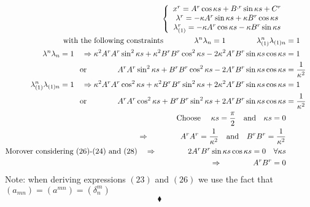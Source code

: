 \begin{align}
\left \{ \begin{array}{c}
x^r = A^{r}\cos \kappa s   + B^{,r}\sin \kappa s + C^r\\
\lambda^r =  -\kappa A^{r}\sin \kappa s  +\kappa B^{r}\cos \kappa s\\
\lambda_{(1)}^r = - \kappa A^{r}\cos \kappa s  - \kappa B^{r}\sin \kappa s\\
\end{array} \right.\\
\text{with the following constraints}\quad\quad\quad\quad \lambda^n\lambda_n = 1\quad\quad\quad\quad 
\lambda_{(1)}^n\lambda_{(1)n} &= 1\\
\lambda^n\lambda_n = 1\quad\Rightarrow \kappa^2 A^r A^r \sin ^2 \kappa s+ \kappa^2 B^r B^r \cos ^2 \kappa s - 2 \kappa^2 A^rB^r\sin\kappa s\cos \kappa s &= 1\\
\text{or} \quad\quad\quad\quad A^r A^r \sin ^2 \kappa s+  B^r B^r \cos ^2 \kappa s - 2 A^rB^r\sin\kappa s\cos \kappa s &= \frac{1}{\kappa^2 }\\
\lambda_{(1)}^n\lambda_{(1)n} = 1\quad\Rightarrow \kappa^2 A^r A^r \cos ^2 \kappa s+ \kappa^2 B^r B^r \sin ^2 \kappa s + 2 \kappa^2 A^rB^r\sin\kappa s\cos \kappa s &= 1\\
\text{or} \quad\quad\quad\quad A^r A^r \cos ^2 \kappa s+  B^r B^r \sin ^2 \kappa s + 2 A^rB^r\sin\kappa s\cos \kappa s &= \frac{1}{\kappa^2 }\\
\text{Choose }\quad \kappa s = \frac{\pi}{2}\quad\text{and} \quad \kappa s = 0\\
\Rightarrow \quad\quad\quad\quad A^r A^r =  \frac{1}{\kappa^2 }\quad\text{and}\quad B^r B^r =  \frac{1}{\kappa^2 }\\
\text{Morover considering (26)-(24) and (28)}\quad \Rightarrow \quad\quad\quad\quad 2A^rB^r\sin \kappa s \cos \kappa s =0 \quad \forall \kappa s\\
\Rightarrow \quad\quad\quad\quad A^rB^r=0
\end{align}
Note: when deriving expressions $(23)$ and $(26)$ we use the fact that $\left(a_{mn}\right) =  \left(a^{mn}\right) = \left(\delta^m_n\right) $
$$\blacklozenge$$
\newpage

